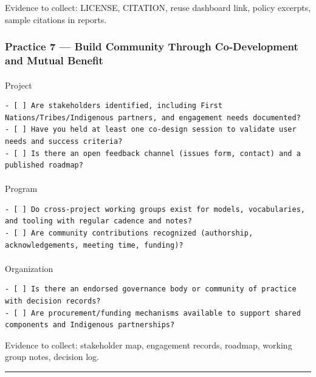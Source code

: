 \documentclass[
  letterpaper,
  DIV=11,
  numbers=noendperiod]{scrartcl}
\makeatletter
\let\oldparagraph\paragraph
\renewcommand{\paragraph}{
    \@ifstar
      \xxxParagraphStar
      \xxxParagraphNoStar
  }
\newcommand{\xxxParagraphStar}[1]{\oldparagraph*{#1}\mbox{}}
\newcommand{\xxxParagraphNoStar}[1]{\oldparagraph{#1}\mbox{}}
\makeatother
\begin{document}
Evidence to collect: LICENSE, CITATION, reuse dashboard link, policy
excerpts, sample citations in reports.

\subsubsection{Practice 7 --- Build Community Through Co‑Development and
Mutual
Benefit}\label{practice-7-build-community-through-codevelopment-and-mutual-benefit}

\paragraph{Project}\label{project-6}

\begin{verbatim}
- [ ] Are stakeholders identified, including First Nations/Tribes/Indigenous partners, and engagement needs documented?
- [ ] Have you held at least one co‑design session to validate user needs and success criteria?
- [ ] Is there an open feedback channel (issues form, contact) and a published roadmap?
\end{verbatim}

\paragraph{Program}\label{program-6}

\begin{verbatim}
- [ ] Do cross‑project working groups exist for models, vocabularies, and tooling with regular cadence and notes?
- [ ] Are community contributions recognized (authorship, acknowledgements, meeting time, funding)?
\end{verbatim}

\paragraph{Organization}\label{organization-6}

\begin{verbatim}
- [ ] Is there an endorsed governance body or community of practice with decision records?
- [ ] Are procurement/funding mechanisms available to support shared components and Indigenous partnerships?
\end{verbatim}

Evidence to collect: stakeholder map, engagement records, roadmap,
working group notes, decision log.

\begin{center}\rule{0.5\linewidth}{0.5pt}\end{center}
\end{document}
